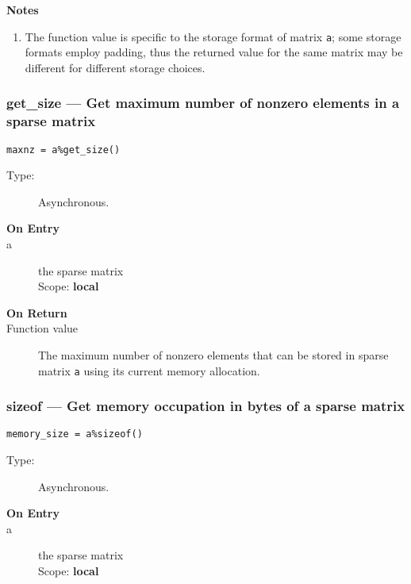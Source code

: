 {\par\noindent\bfseries Notes}
\begin{enumerate}
\item The function value is specific to the storage format of matrix
  \verb|a|; some storage formats employ padding, thus the returned
  value for the same matrix may be different for different storage choices.
\end{enumerate}

\subsubsection{get\_size  --- Get maximum number of nonzero elements
  in a sparse matrix}

\begin{verbatim}
maxnz = a%get_size()
\end{verbatim}

\begin{description}
\item[Type:] Asynchronous.
\item[\bf On Entry]
\item[a] the sparse matrix\\
Scope: {\bf local}\\
\end{description}

\begin{description}
\item[\bf On Return]
\item[Function value] The maximum number of nonzero elements that can
  be stored in sparse matrix \verb|a| using its current memory allocation.
\end{description}

\subsubsection{sizeof  --- Get memory occupation in bytes
of  a sparse matrix}

\begin{verbatim}
memory_size = a%sizeof()
\end{verbatim}

\begin{description}
\item[Type:] Asynchronous.
\item[\bf On Entry]
\item[a] the sparse matrix\\
Scope: {\bf local}\\
\end{description}

